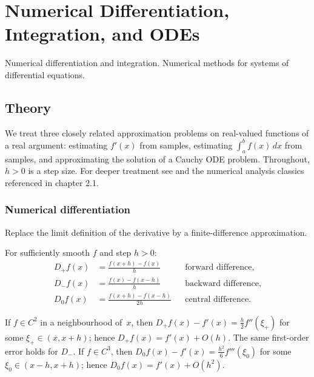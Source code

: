 
\section{Numerical Differentiation, Integration, and ODEs}
\label{sec:1.3.05-numerical-diff-int-ode}

\begin{ticket}
Numerical differentiation and integration. Numerical methods for systems of differential equations.
\end{ticket}

\subsection*{Theory}

We treat three closely related approximation problems on real-valued
functions of a real argument: estimating $f'(x)$ from samples,
estimating $\int_a^b f(x)\, dx$ from samples, and approximating the
solution of a Cauchy ODE problem. Throughout, $h > 0$ is a step size.
For deeper treatment see \cite[Ch.~28]{CLRS2013} and the numerical
analysis classics referenced in chapter 2.1.

\subsubsection*{Numerical differentiation}

Replace the limit definition of the derivative by a finite-difference
approximation.

\begin{definition}
\label{def:finite-diff}
For sufficiently smooth $f$ and step $h > 0$:
\begin{align*}
  D_+ f(x) &= \frac{f(x + h) - f(x)}{h} && \text{forward difference,} \\
  D_- f(x) &= \frac{f(x) - f(x - h)}{h} && \text{backward difference,} \\
  D_0 f(x) &= \frac{f(x + h) - f(x - h)}{2h} && \text{central difference.}
\end{align*}
\end{definition}

\begin{theorem}
\label{thm:finite-diff-error}
If $f \in C^2$ in a neighbourhood of~$x$, then
$D_+ f(x) - f'(x) = \tfrac{h}{2} f''(\xi_+)$ for some $\xi_+ \in (x, x + h)$;
hence $D_+ f(x) = f'(x) + O(h)$. The same first-order error holds for
$D_-$. If $f \in C^3$, then
$D_0 f(x) - f'(x) = \tfrac{h^2}{6} f'''(\xi_0)$ for some
$\xi_0 \in (x - h, x + h)$; hence $D_0 f(x) = f'(x) + O(h^2)$.
\end{theorem}

